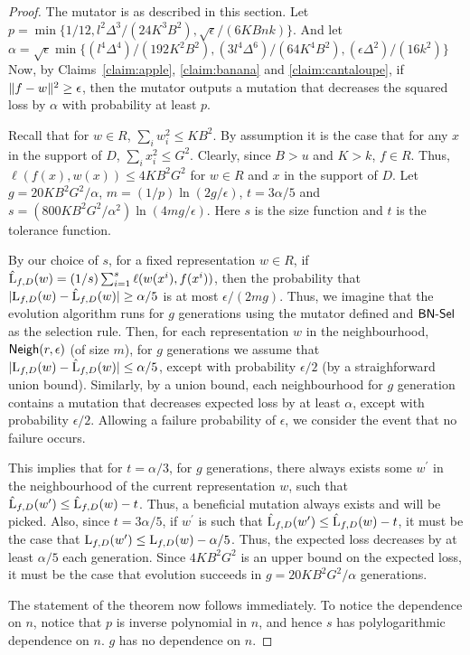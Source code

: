 \begin{proof}
The mutator is as described in this section. Let $p = \min\{1/12,
l^2\Delta^3/(24K^3B^2), \sqrt{\epsilon}/(6KBnk)\}$. And let $\alpha =
\sqrt{\epsilon} \min\{(l^4 \Delta^4)/(192 K^2B^2), (3 l^4 \Delta^6)/(64K^4B^2),
(\epsilon\Delta^2)/(16k^2)\}$ Now, by Claims~\ref{claim:apple},
\ref{claim:banana} and \ref{claim:cantaloupe}, if $\Vert f - w \Vert^2 \geq
\epsilon$, then the mutator outputs a mutation that decreases the squared loss
by $\alpha$ with probability at least $p$.

Recall that for $w \in R$, $\sum_{i} w_i^2 \leq KB^2$. By assumption it is the
case that for any $x$ in the support of $D$, $\sum_{i} x_i^2 \leq G^2$. Clearly,
since $B > u$ and $K > k$, $f \in R$. Thus, $\ell(f(x), w(x)) \leq 4KB^2G^2$ for
$w \in R$ and $x$ in the support of $D$. Let $g = 20 KB^2G^2/\alpha$, $m =
(1/p)\ln(2g/\epsilon)$, $t = 3\alpha/5$  and $s = (800 KB^2G^2/\alpha^2)
\ln(4mg/\epsilon)$. Here $s$ is the size function and $t$ is the tolerance
function.

By our choice of $s$, for a fixed representation $w \in R$, if $\hat{\mathrm{L}}_{f,
D}(w) = (1/s) \sum_{i = 1}^s \ell(w(x^i), f(x^i))$, then the probability that
$|\mathrm{L}_{f, D}(w) - \hat{\mathrm{L}}_{f, D}(w)| \geq \alpha/5$ is at most
$\epsilon/(2mg)$. Thus, we imagine that the evolution algorithm runs for $g$
generations using the mutator defined and $\mathsf{BN\mbox{-}Sel}$ as the selection rule. Then,
for each representation $w$ in the neighbourhood, $\mathsf{Neigh}(r, \epsilon)$ (of size
$m$), for $g$ generations we assume that $|\mathrm{L}_{f, D}(w) - \hat{\mathrm{L}}_{f,
D}(w)| \leq \alpha/5$, except with probability $\epsilon/2$ (by a straighforward
union bound). Similarly, by a union bound, each neighbourhood for $g$ generation
contains a mutation that decreases expected loss by at least $\alpha$, except
with probability $\epsilon/2$. Allowing a failure probability of $\epsilon$, we
consider the event that no failure occurs. 

This implies that for $t = \alpha/3$, for $g$ generations, there always exists
some $w^\prime$ in the neighbourhood of the current representation $w$, such
that $\hat{\mathrm{L}}_{f, D}(w^\prime) \leq \hat{\mathrm{L}}_{f, D}(w) - t$. Thus, a
beneficial mutation always exists and will be picked. Also, since $t = 3
\alpha/5$, if $w^\prime$ is such that $\hat{\mathrm{L}}_{f, D}(w^\prime) \leq
\hat{\mathrm{L}}_{f, D}(w) - t$, it must be the case that $\mathrm{L}_{f, D}(w^\prime) \leq
\mathrm{L}_{f, D}(w) - \alpha/5$. Thus, the expected loss decreases by at least
$\alpha/5$ each generation. Since $4KB^2G^2$ is an upper bound on the expected
loss, it must be the case that evolution succeeds in $g = 20 KB^2G^2/\alpha$
generations.

The statement of the theorem now follows immediately. To notice the dependence
on $n$, notice that $p$ is inverse polynomial in $n$, and hence $s$ has
polylogarithmic dependence on $n$. $g$ has no dependence on $n$.
\end{proof}

